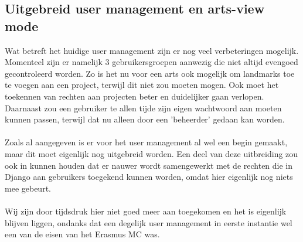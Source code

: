 \subsection{Uitgebreid user management en arts-view mode} %
Wat betreft het huidige user management zijn er nog veel verbeteringen mogelijk.
Momenteel zijn er namelijk 3 gebruikersgroepen aanwezig die niet altijd evengoed gecontroleerd worden.
Zo is het nu voor een arts ook mogelijk om landmarks toe te voegen aan een project, terwijl dit niet zou moeten mogen.
Ook moet het toekennen van rechten aan projecten beter en duidelijker gaan verlopen.
Daarnaast zou een gebruiker te allen tijde zijn eigen wachtwoord aan moeten kunnen passen, terwijl dat nu alleen door een 'beheerder' gedaan kan worden.
\\
\\
Zoals al aangegeven is er voor het user management al wel een begin gemaakt, maar dit moet eigenlijk nog uitgebreid worden.
Een deel van deze uitbreiding zou ook in kunnen houden dat er nauwer wordt samengewerkt met de rechten die in Django aan gebruikers toegekend kunnen worden, omdat hier eigenlijk nog niets mee gebeurt.
\\
\\
Wij zijn door tijdsdruk hier niet goed meer aan toegekomen en het is eigenlijk blijven liggen, ondanks dat een degelijk user management in eerste instantie wel een van de eisen van het Erasmus MC was.

